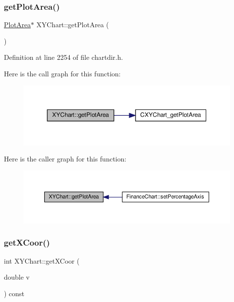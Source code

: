 \subsubsection{\texorpdfstring{get\+Plot\+Area()}{getPlotArea()}}
{\footnotesize\ttfamily \hyperlink{class_plot_area}{Plot\+Area}$\ast$ X\+Y\+Chart\+::get\+Plot\+Area (\begin{DoxyParamCaption}{ }\end{DoxyParamCaption})\hspace{0.3cm}{\ttfamily [inline]}}



Definition at line 2254 of file chartdir.\+h.

Here is the call graph for this function\+:
\nopagebreak
\begin{figure}[H]
\begin{center}
\leavevmode
\includegraphics[width=345pt]{class_x_y_chart_a7159f46e6ac9491d9f373f81b7a4632b_cgraph}
\end{center}
\end{figure}
Here is the caller graph for this function\+:
\nopagebreak
\begin{figure}[H]
\begin{center}
\leavevmode
\includegraphics[width=350pt]{class_x_y_chart_a7159f46e6ac9491d9f373f81b7a4632b_icgraph}
\end{center}
\end{figure}
\mbox{\label{class_x_y_chart_af5f0a34609220660b81835c11a395286}} 
\subsubsection{\texorpdfstring{get\+X\+Coor()}{getXCoor()}}
{\footnotesize\ttfamily int X\+Y\+Chart\+::get\+X\+Coor (\begin{DoxyParamCaption}\item[{double}]{v }\end{DoxyParamCaption}) const\hspace{0.3cm}{\ttfamily [inline]}}



